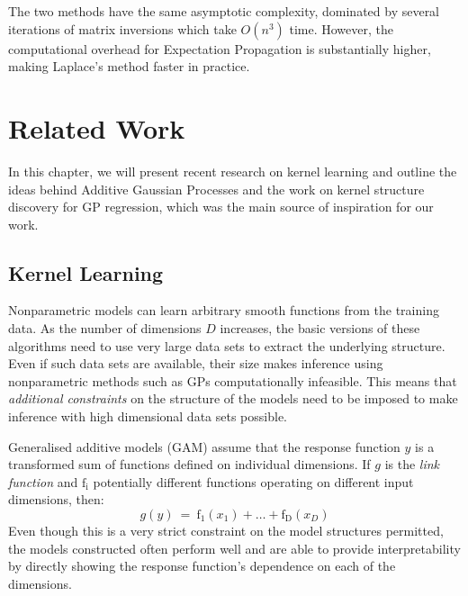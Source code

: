 \documentclass[a4paper,12pt ]{report}
\renewcommand{\GP}{{GP}}
\begin{document}
The two methods have the same asymptotic complexity, dominated by several iterations of matrix inversions which take $O(n^3)$ time. However, the computational overhead for Expectation Propagation is substantially higher, making Laplace's method faster in practice. %

\cleardoublepage


\chapter{Related Work}

In this chapter, we will present recent research on kernel learning and outline the ideas behind Additive Gaussian Processes and the work on kernel structure discovery for {\GP} regression, which was the main source of inspiration for our work.

\section{Kernel Learning}

Nonparametric models can learn arbitrary smooth functions from the training data. As the number of dimensions $D$ increases, the basic versions of these algorithms need to use very large data sets to extract the underlying structure. Even if such data sets are available, their size makes inference using nonparametric methods such as {\GP}s computationally infeasible. This means that \emph{additional constraints} on the structure of the models need to be imposed to make inference with high dimensional data sets possible.

Generalised additive models (GAM) assume that the response function $y$ is a transformed sum of functions defined on individual dimensions. If $g$ is the \emph{link function} and $\mathrm{f_i}$ potentially different functions operating on different input dimensions, then:
\begin{equation*} g( y ) ~=~ \mathrm{f_{1}}(x_1) + \ldots + \mathrm{f_{D}}(x_D)  \end{equation*}
Even though this is a very strict constraint on the model structures permitted, the models constructed often perform well and are able to provide interpretability by directly showing the response function's dependence on each of the dimensions.
\end{document}
